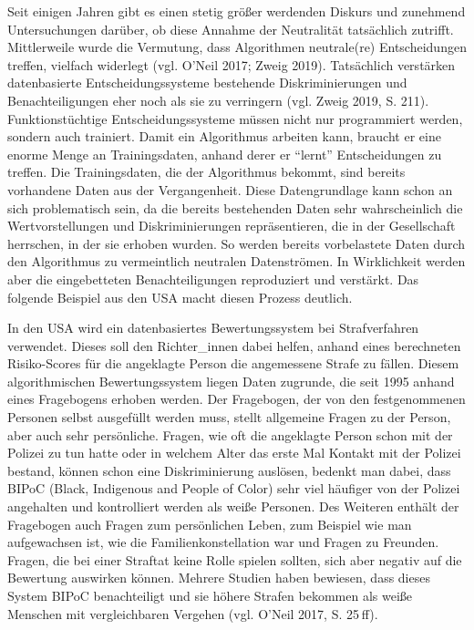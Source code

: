 \documentclass[a4paper,
fontsize=11pt,
oneside,
numbers=noperiodatend,
parskip=half-,
bibliography=totoc,
final
]{scrartcl}
\begin{document}
Seit einigen Jahren gibt es einen stetig größer werdenden Diskurs und
zunehmend Untersuchungen darüber, ob diese Annahme der Neutralität
tatsächlich zutrifft. Mittlerweile wurde die Vermutung, dass Algorithmen
neutrale(re) Entscheidungen treffen, vielfach widerlegt (vgl. O'Neil
2017; Zweig 2019). Tatsächlich verstärken datenbasierte
Entscheidungssysteme bestehende Diskriminierungen und Benachteiligungen
eher noch als sie zu verringern (vgl. Zweig 2019, S. 211).
Funktionstüchtige Entscheidungssysteme müssen nicht nur programmiert
werden, sondern auch trainiert. Damit ein Algorithmus arbeiten kann,
braucht er eine enorme Menge an Trainingsdaten, anhand derer er
\enquote{lernt} Entscheidungen zu treffen. Die Trainingsdaten, die der
Algorithmus bekommt, sind bereits vorhandene Daten aus der
Vergangenheit. Diese Datengrundlage kann schon an sich problematisch
sein, da die bereits bestehenden Daten sehr wahrscheinlich die
Wertvorstellungen und Diskriminierungen repräsentieren, die in der
Gesellschaft herrschen, in der sie erhoben wurden. So werden bereits
vorbelastete Daten durch den Algorithmus zu vermeintlich neutralen
Datenströmen. In Wirklichkeit werden aber die eingebetteten
Benachteiligungen reproduziert und verstärkt. Das folgende Beispiel aus
den USA macht diesen Prozess deutlich.

In den USA wird ein datenbasiertes Bewertungssystem bei Strafverfahren
verwendet. Dieses soll den Richter\_innen dabei helfen, anhand eines
berechneten Risiko-Scores für die angeklagte Person die angemessene
Strafe zu fällen. Diesem algorithmischen Bewertungssystem liegen Daten
zugrunde, die seit 1995 anhand eines Fragebogens erhoben werden. Der
Fragebogen, der von den festgenommenen Personen selbst ausgefüllt werden
muss, stellt allgemeine Fragen zu der Person, aber auch sehr
persönliche. Fragen, wie oft die angeklagte Person schon mit der Polizei
zu tun hatte oder in welchem Alter das erste Mal Kontakt mit der Polizei
bestand, können schon eine Diskriminierung auslösen, bedenkt man dabei,
dass BIPoC (Black, Indigenous and People of Color) sehr viel häufiger
von der Polizei angehalten und kontrolliert werden als weiße Personen.
Des Weiteren enthält der Fragebogen auch Fragen zum persönlichen Leben,
zum Beispiel wie man aufgewachsen ist, wie die Familienkonstellation war
und Fragen zu Freunden. Fragen, die bei einer Straftat keine Rolle
spielen sollten, sich aber negativ auf die Bewertung auswirken können.
Mehrere Studien haben bewiesen, dass dieses System BIPoC benachteiligt
und sie höhere Strafen bekommen als weiße Menschen mit vergleichbaren
Vergehen (vgl. O'Neil 2017, S. 25 ff).
\end{document}
